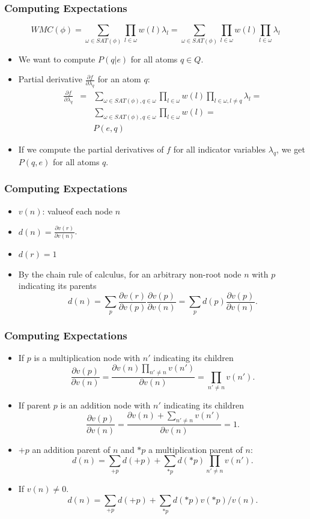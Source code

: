 \documentclass[trans,aspectratio=1610]{beamer}
\newcommand\WMC{\mathit{WMC}}
\begin{document}
\begin{frame}
 \frametitle{Computing Expectations}
$$\WMC(\phi)=\sum_{\omega\in SAT(\phi)}\prod_{l\in \omega}w(l)\lambda_l=\sum_{\omega\in SAT(\phi)}\prod_{l\in \omega}w(l)\prod_{l\in \omega}\lambda_l$$
\begin{itemize}
\item
We want to compute 
$P(q|e)$ for all atoms $q\in Q$. 
\item Partial derivative $\frac{\partial f}{\partial \lambda_q}$ for an atom $q$:
\begin{eqnarray*}
\frac{\partial f}{\partial \lambda_q}&=&\sum_{\omega\in SAT(\phi),q\in\omega}\prod_{l\in \omega}w(l)\prod_{l\in \omega,l\neq q}\lambda_l=\\
&&\sum_{\omega\in SAT(\phi),q\in\omega}\prod_{l\in \omega}w(l)=\\
&&P(e,q)
\end{eqnarray*}
\item If we compute the partial derivatives of $f$ for all indicator variables $\lambda_q$,  we get $P(q,e)$ for all atoms $q$.
\end{itemize}
\end{frame}
\begin{frame}
 \frametitle{Computing Expectations}
 \begin{itemize}
\item  $v(n)$: valueof each
node $n$ 
\item 
$d(n)=\frac{\partial v(r)}{\partial v(n)}$.
\item $d(r)=1$ 
\item By the chain rule of calculus, for an
arbitrary non-root node $n$ with  $p$ indicating its parents
$$d(n)=\sum_{p}\frac{\partial v(r)}{\partial v(p)}\frac{\partial v(p)}{\partial v(n)}=\sum_{p}d(p)\frac{\partial v(p)}{\partial v(n)}.$$
\end{itemize}
\end{frame}
\begin{frame}
 \frametitle{Computing Expectations}
 \begin{itemize}
\item 
If  $p$ is a multiplication node with $n'$ indicating its children
$$\frac{\partial v(p)}{\partial v(n)}=\frac{\partial v(n)\prod_{n'\neq n} v(n')}{\partial v(n)}=\prod_{n'\neq n} v(n').$$
\item 
If parent $p$ is an addition node with $n'$ indicating its children
$$\frac{\partial v(p)}{\partial v(n)}=\frac{\partial v(n)+\sum_{n'\neq n} v(n')}{\partial v(n)}=1.$$
\item  $+p$ an addition parent of $n$ and  $*p$ a multiplication parent of $n$:
$$d(n)=\sum_{+p}d(+p)+\sum_{*p}d(*p)\prod_{n'\neq n} v(n').$$
\item
If $v(n)\neq 0$. 
 $$d(n)=\sum_{+p}d(+p)+\sum_{*p}d(*p)v(*p)/v(n).$$
\end{itemize}
\end{frame}
\end{document}
